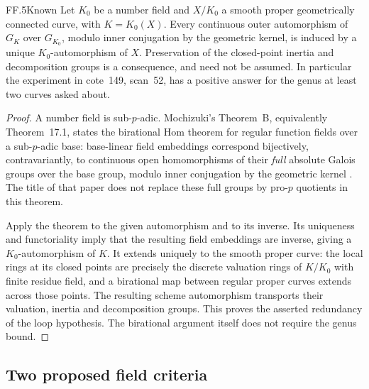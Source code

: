 \begin{claim}{FF.5}{Known}\label{clm:FF5}
Let \(K_0\) be a number field and \(X/K_0\) a smooth proper
geometrically connected curve, with \(K=K_0(X)\). Every continuous
outer automorphism of \(G_K\) over \(G_{K_0}\), modulo inner
conjugation by the geometric kernel, is induced by a unique
\(K_0\)-automorphism of \(X\). Preservation of the closed-point
inertia and decomposition groups is a consequence, and need not be
assumed. In particular the experiment in cote~149, scan~52, has a
positive answer for the genus at least two curves asked about.
\end{claim}
\begin{proof}
A number field is sub-\(p\)-adic. Mochizuki's Theorem~B, equivalently
Theorem~17.1, states the birational Hom theorem for regular function
fields over a sub-\(p\)-adic base: base-linear field embeddings
correspond bijectively, contravariantly, to continuous open
homomorphisms of their \emph{full} absolute Galois groups over the
base group, modulo inner conjugation by the geometric kernel
\citep[Theorem~17.1, author pp.~87--88]{FF_Mochizuki1999}.
The title of that paper does not replace these full groups by
pro-\(p\) quotients in this theorem.

Apply the theorem to the given automorphism and to its inverse.
Its uniqueness and functoriality imply that the resulting field
embeddings are inverse, giving a \(K_0\)-automorphism of \(K\).
It extends uniquely to the smooth proper curve: the local rings at
its closed points are precisely the discrete valuation rings of
\(K/K_0\) with finite residue field, and a birational map between
regular proper curves extends across those points. The resulting
scheme automorphism transports their valuation, inertia and
decomposition groups. This proves the asserted redundancy of the
loop hypothesis. The birational argument itself does not require
the genus bound.
\end{proof}

\subsection{Two proposed field criteria}

